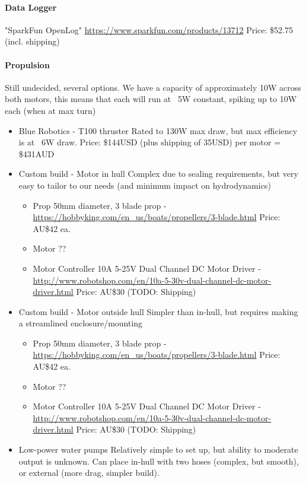 \paragraph{Data Logger}
"SparkFun OpenLog"
\url{https://www.sparkfun.com/products/13712}
Price: \$52.75 (incl. shipping)

\paragraph{Propulsion}
Still undecided, several options. We have a capacity of approximately 10W across both motors, this means that each will run at ~5W constant, spiking up to 10W each (when at max turn)
\begin{itemize}
\item{Blue Robotics - T100 thruster}
 Rated to 130W max draw, but max efficiency is at ~6W draw.
 Price: \$144USD (plus shipping of 35USD) per motor = \$431AUD
\item{Custom build - Motor in hull}
 Complex due to sealing requirements, but very easy to tailor to our needs (and minimum impact on hydrodynamics)
 \begin{itemize}
 \item{Prop} 50mm diameter, 3 blade prop - \url{https://hobbyking.com/en_us/boats/propellers/3-blade.html} Price: AU\$42 ea.
 \item{Motor} ??
 \item{Motor Controller} 10A 5-25V Dual Channel DC Motor Driver - \url{http://www.robotshop.com/en/10a-5-30v-dual-channel-dc-motor-driver.html} Price: AU\$30 (TODO: Shipping)
 \end{itemize}
\item{Custom build - Motor outside hull}
 Simpler than in-hull, but requires making a streamlined enclosure/mounting
 \begin{itemize}
 \item{Prop} 50mm diameter, 3 blade prop - \url{https://hobbyking.com/en_us/boats/propellers/3-blade.html} Price: AU\$42 ea.
 \item{Motor} ??
 \item{Motor Controller} 10A 5-25V Dual Channel DC Motor Driver - \url{http://www.robotshop.com/en/10a-5-30v-dual-channel-dc-motor-driver.html} Price: AU\$30 (TODO: Shipping)
 \end{itemize}
\item{Low-power water pumps}
 Relatively simple to set up, but ability to moderate output is unknown. Can place in-hull with two hoses (complex, but smooth), or external (more drag, simpler build).
\end{itemize}


